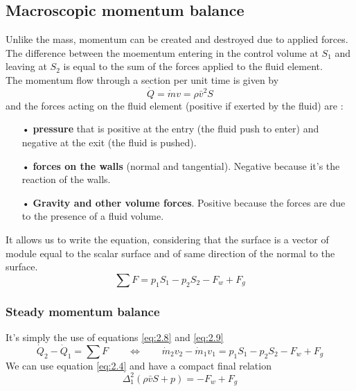	\subsection{Macroscopic momentum balance}
		Unlike the mass, momentum can be created and destroyed due to applied forces. The difference between the moementum entering in the control volume at $S_1$ and leaving at $S_2$ is equal to the sum of the forces applied to the fluid element. \\
		The momentum flow through a section per unit time is given by 
		\begin{equation}
			\dot{Q} = \dot{m}v = \rho \bar{v}^2 S
			\label{eq:2.8}
		\end{equation}
			and the forces acting on the fluid element (positive if exerted by the fluid) are :
			
		\begin{itemize}
				\item[•] \textbf{pressure} that is positive at the entry (the fluid push to enter) and negative at the exit (the fluid is pushed).
				\item[•] \textbf{forces on the walls} (normal and tangential). Negative because it's the reaction of the walls.
				\item[•] \textbf{Gravity and other volume forces}. Positive because the forces are due to the presence of a fluid volume. \\
		\end{itemize}

		It allows us to write the equation, considering that the surface is a vector of module equal to the scalar surface and of same direction of the normal to the surface. 
		\begin{equation}
			\sum F = p_1S_1 - p_2S_2 - F_w + F_g
			\label{eq:2.9}
		\end{equation}
		
		\subsubsection{Steady momentum balance}
			It's simply the use of equations \autoref{eq:2.8} and \autoref{eq:2.9}			
			\begin{equation}
				\dot{Q}_2 - \dot{Q}_1 = \sum F \qquad \Leftrightarrow \qquad \dot{m}_2v_2 - \dot{m}_1v_1 = p_1S_1 -p_2S_2 - F_w + F_g
			\end{equation}
			We can use equation \autoref{eq:2.4} and have a compact final relation 
			\begin{equation}
				\Delta ^2 _1 (\rho \bar{v}S + p) = -F_w+F_g
			\end{equation}
			
